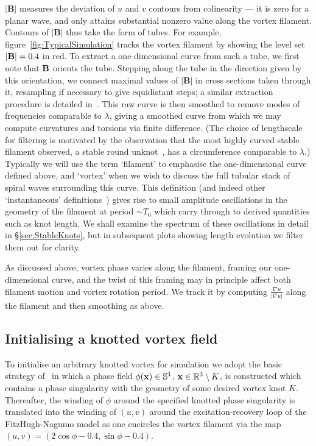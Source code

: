 $|\mathbf{B}|$ measures the deviation of $u$ and $v$ contours from colinearity --- it is zero for a planar wave, and only attains substantial nonzero value along the vortex filament. Contours of $|\mathbf{B}|$ thus take the form of tubes. For example, figure~\ref{fig:TypicalSimulation} tracks the vortex filament by showing the level set $|{\bf B}| = 0.4$ in red. To extract a one-dimensional curve from such a tube, we first note that $\bf B$ orients the tube. Stepping along the tube in the direction given by this orientation, we connect maximal values of $|\mathbf{B}|$ in cross sections taken through it, resampling if necessary to give equidistant steps; a similar extraction procedure is detailed in~\citep{Winfree1990}. This raw curve is then smoothed to remove modes of frequencies comparable to $\lambda$, giving a smoothed curve from which we may compute curvatures and torsions via finite difference. (The choice of lengthscale for filtering is motivated by the observation that the most highly curved stable filament observed, a stable round unknot~\citep{Courtemanche1990}, has a circumference comparable to $\lambda$.) Typically we will use the term `filament' to emphasise the one-dimensional curve defined above, and `vortex' when we wish to discuss the full tubular stack of spiral waves surrounding this curve. This definition (and indeed other `instantaneous' definitions~\citep{Dowle1997}) gives rise to small amplitude oscillations in the geometry of the filament at period $\sim T_0$ which carry through to derived quantities such as knot length. We shall examine the spectrum of these oscillations in detail in \S\ref{sec:StableKnots}, but in subsequent plots showing length evolution we filter them out for clarity. 

As discussed above, vortex phase varies along the filament, framing our one-dimensional curve, and the twist of this framing may in principle affect both filament motion and vortex rotation period. We track it by computing $\frac{\nabla u}{|\nabla u|}$ along the filament and then smoothing as above. 

\subsection{Initialising a knotted vortex field}
\label{subsec:WavefieldInitialisation}

To initialise an arbitrary knotted vortex for simulation we adopt the basic strategy of~\citep{Sutcliffe2003,Maucher2016} in which a phase field $\phi( {\bf x}) \in \mathbb{S}^1$, ${\bf x} \in \mathbb{R}^3\setminus K$, is constructed which contains a phase singularity with the geometry of some desired vortex knot $K$. Thereafter, the winding of $\phi$ around the specified knotted phase singularity is translated into the winding of $(u,v)$ around the excitation-recovery loop of the FitzHugh-Nagumo model as one encircles the vortex filament via the map $ (u,v) = (2 \cos \phi - 0.4, \sin \phi - 0.4)$.

